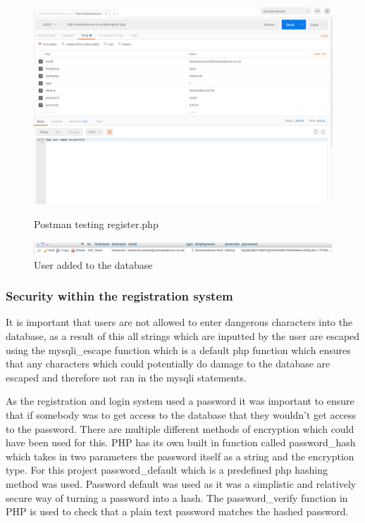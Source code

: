 \begin{center} 
\begin{figure}[H]
\includegraphics[scale=0.45]{images/postman}
\caption{Postman testing register.php}
\includegraphics[scale=0.45]{images/db1}
\caption{User added to the database}
\end{figure}
\end{center}

\subsubsection{Security within the registration system}
It is important that users are not allowed to enter dangerous characters into the database, as a result of this all strings which are inputted by the user are escaped using the mysqli\_escape function which is a default php function which ensures that any characters which could potentially do damage to the database are escaped and therefore not ran in the mysqli statements.

As the registration and login system used a password it was important to ensure that if somebody was to get access to the database that they wouldn't get access to the password. There are multiple different methods of encryption which could have been used for this. PHP has its own built in function called password\_hash which takes in two parameters the password itself as a string and the encryption type. For this project password\_default which is a predefined php hashing method was used. Password default was used as it was a simplistic and relatively secure way of turning a password into a hash. The password\_verify function in PHP is used to check that a plain text password matches the hashed password.
 
